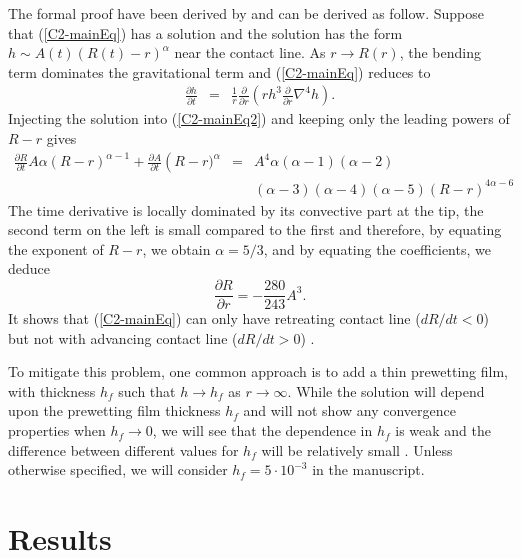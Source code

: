 The formal proof  have been derived by  \citet{Flitton:1999iv} and can
be derived  as follow. Suppose  that (\ref{C2-mainEq}) has  a solution
and the solution has the  form $h \sim A(t)(R(t)-r)^{\alpha}$ near the
contact line.  As $r \rightarrow R(r)$, the bending term dominates the
gravitational term and (\ref{C2-mainEq}) reduces to
\begin{eqnarray}
  \frac{\partial       h}{\partial       t}&      =&\frac{1}{       r}
                                                     \frac{\partial}{\partial r}\left( rh^3 \frac{\partial}{\partial r}\nabla^4h\right).
                                                     \label{C2-mainEq2}
\end{eqnarray}
Injecting the  solution into  (\ref{C2-mainEq2}) and keeping  only the
leading powers of $R-r$ gives
\begin{eqnarray}
  \frac{\partial    R}{\partial    t}    A\alpha\left(R-r\right)^{\alpha-1}+
  \frac{\partial           A}{\partial           t}\left(R-r)^{\alpha}
  &=&A^4\alpha(\alpha-1)(\alpha-2)\nonumber\\
  &&(\alpha-3)(\alpha-4)(\alpha-5)(R-r)^{4\alpha-6}\nonumber
\end{eqnarray}
The time derivative is locally dominated by its convective part at the
tip, the second  term on the left  is small compared to  the first and
therefore,   by   equating   the   exponent  of   $R-r$,   we   obtain
$\alpha = 5/3$, and by equating the coefficients, we deduce
\begin{equation}
  \frac{\partial R}{\partial r} =-\frac{280}{243} A^3.
\end{equation}
It shows that (\ref{C2-mainEq}) can  only have retreating contact line
($dR/dt<0$)   but  not   with  advancing   contact  line   ($dR/dt>0$)
\citep{Lister:2013ia,Flitton:1999iv}.

To  mitigate this  problem,  one  common approach  is  to  add a  thin
prewetting film, with thickness $h_f$ such that $h\rightarrow h_f$ as
$r\rightarrow  \infty$.   While  the  solution will  depend  upon  the
prewetting  film thickness  $h_f$ and  will not  show any  convergence
properties when $h_f\rightarrow 0$, we will see that the dependence in
$h_f$ is  weak and the  difference between different values  for $h_f$
will  be  relatively  small  \citep{Lister:2013ia,Anonymous:QWXp_4JV}.
Unless otherwise specified, we will consider $h_f = 5\cdot 10^{-3}$ in
the manuscript.



\section{Results}
\label{C2-sec:regime-propagations}

